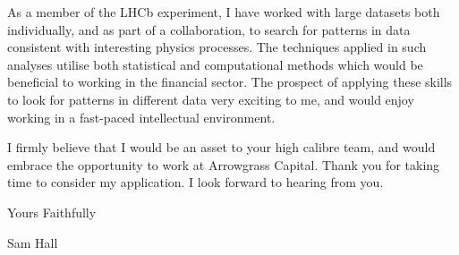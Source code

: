 As a member of the LHCb experiment,
I have worked with large datasets both individually, and as part of a collaboration, to search for
patterns in data consistent with interesting physics processes.
The techniques applied in such analyses utilise both statistical and computational methods which
would be beneficial to working in the financial sector.
The prospect of applying these skills to look for patterns in different data very exciting to me,
and would enjoy working in a fast-paced intellectual environment.



I firmly believe that I would be an asset to your high calibre team, and would embrace the
opportunity to work at Arrowgrass Capital.
Thank you for taking time to consider my application.
I look forward to hearing from you.










Yours Faithfully


Sam Hall


